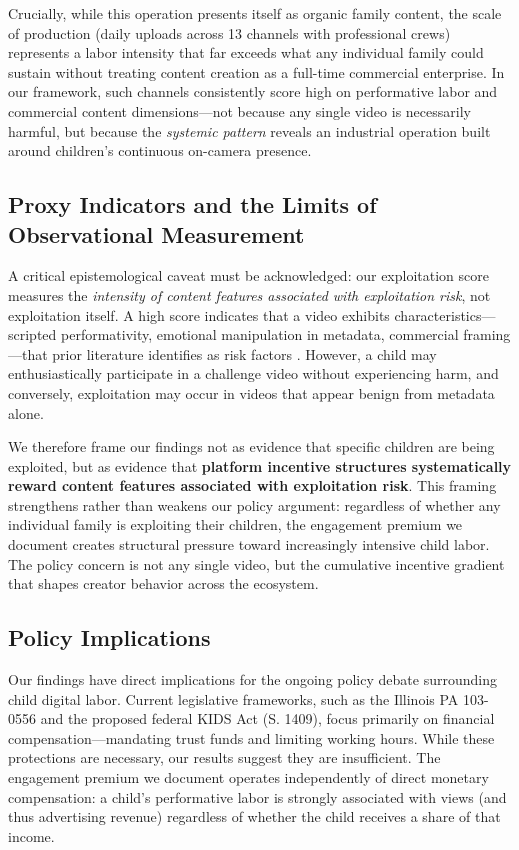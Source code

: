 \documentclass[]{ieeeaccess}
\begin{document}
Crucially, while this operation presents itself as organic family content, the scale of production (daily uploads across 13 channels with professional crews) represents a labor intensity that far exceeds what any individual family could sustain without treating content creation as a full-time commercial enterprise. In our framework, such channels consistently score high on performative labor and commercial content dimensions---not because any single video is necessarily harmful, but because the \emph{systemic pattern} reveals an industrial operation built around children's continuous on-camera presence.

\subsection{Proxy Indicators and the Limits of Observational Measurement}

A critical epistemological caveat must be acknowledged: our exploitation score measures the \emph{intensity of content features associated with exploitation risk}, not exploitation itself. A high score indicates that a video exhibits characteristics---scripted performativity, emotional manipulation in metadata, commercial framing---that prior literature identifies as risk factors \cite{clark2025child,divon2025children}. However, a child may enthusiastically participate in a challenge video without experiencing harm, and conversely, exploitation may occur in videos that appear benign from metadata alone.

We therefore frame our findings not as evidence that specific children are being exploited, but as evidence that \textbf{platform incentive structures systematically reward content features associated with exploitation risk}. This framing strengthens rather than weakens our policy argument: regardless of whether any individual family is exploiting their children, the engagement premium we document creates structural pressure toward increasingly intensive child labor. The policy concern is not any single video, but the cumulative incentive gradient that shapes creator behavior across the ecosystem.

\subsection{Policy Implications}

Our findings have direct implications for the ongoing policy debate surrounding child digital labor. Current legislative frameworks, such as the Illinois PA 103-0556 and the proposed federal KIDS Act (S. 1409), focus primarily on financial compensation---mandating trust funds and limiting working hours. While these protections are necessary, our results suggest they are insufficient. The engagement premium we document operates independently of direct monetary compensation: a child's performative labor is strongly associated with views (and thus advertising revenue) regardless of whether the child receives a share of that income.
\end{document}
